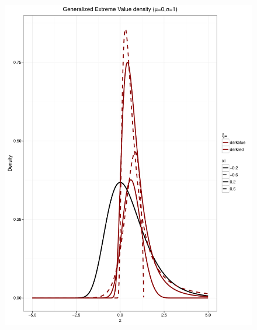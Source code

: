 \iffalse
\begin{figure}[!h]
	\minipage{\textwidth}
	\includegraphics[width=\linewidth]{GEVV.pdf}
	\caption{ }\label{mcacls}
	\endminipage
\end{figure}
